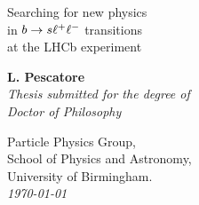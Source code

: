 \documentclass[a4paper,twoside,12pt]{report}
\newcommand{\thesistitle}{
Searching for new physics  \\
in $\bquark\to\squark\ll$ transitions \\
 at the {\rm LHC\textrm{b}} experiment
 }
\newcommand{\thesisauthor}{L. Pescatore} %
\newcommand{\thesiscrest}{crest_1}
\begin{document}
\begin{titlepage}
  \begin{center}
    \huge\sc\linespread{2} \thesistitle\\
    \end{center}
    \begin{center}
    \vspace{3.0cm}
    {\Large\bf \thesisauthor}\\
    \vspace{1.5cm}
    {\large\em Thesis submitted for the degree of}\\
    {\large\em Doctor of Philosophy}\\
    \vspace{1.5cm}
  \end{center}
  \begin{center}
  \end{center}
  \begin{flushleft}
    \hspace{7.5cm} Particle Physics Group, \\
    \hspace{7.5cm} School of Physics and Astronomy, \\
    \hspace{7.5cm} University of Birmingham. \\
    \vspace{1cm}
    \hspace{7.5cm} \emph{\today} \\
  \end{flushleft}
  \begin{center}
  \end{center}
\end{titlepage}

\thispagestyle{empty}%
~
\newpage


\pagestyle{fancy} %
\fancyfoot{} %
\fancyhead{}
\fancyhead[RE]{\sf \slshape \rightmark \hspace{5mm} \thepage }
\fancyhead[LO]{\sf \thepage \hspace{5mm} \slshape \leftmark }

\setcounter{tocdepth}{3}
\setcounter{secnumdepth}{3}
\renewcommand\tocloftpagestyle{fancy}
\renewcommand\cftchapfont{\large\sf}
\renewcommand\cftsecfont{\normalsize \sf}
\renewcommand\cftsubsecfont{\small\sf}
\renewcommand\cftsubsubsecfont{\footnotesize \sf}
%
\renewcommand\cftchappagefont{\bfseries\sffamily}
\renewcommand\cftsecpagefont{\bfseries\sffamily}
\renewcommand\cftsubsecpagefont{\bfseries\sffamily}
\renewcommand\cftsubsubsecpagefont{\bfseries\sffamily}
%
\renewcommand\cftloftitlefont{\Huge\sf}
\renewcommand\cftlottitlefont{\Huge\sf}
\renewcommand\cfttoctitlefont{\Huge\sf}
\end{document}
